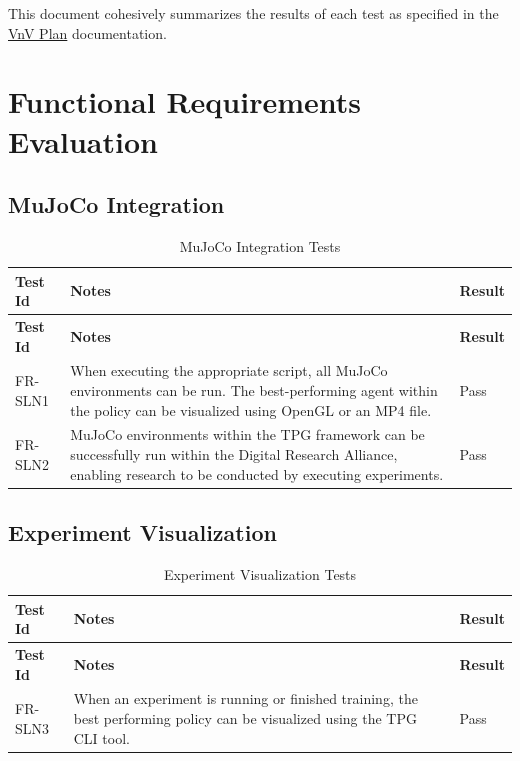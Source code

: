 \documentclass[12pt, titlepage]{article}
\begin{document}
\newpage


This document cohesively summarizes the results of each test as specified in the \href{https://github.com/TPGEngine/tpg/blob/main/docs/VnVPlan/VnVPlan.pdf}{VnV Plan} documentation.

\section{Functional Requirements Evaluation}

\subsection{MuJoCo Integration}\label{mujoco_integration}

\begin{center}
    \begin{longtable}{|p{2cm}|p{8cm}|p{2cm}|}
      \caption{MuJoCo Integration Tests} \\
    \hline
    \textbf{Test Id} & \textbf{Notes} & \textbf{Result} \\
    \hline
    \endfirsthead
    \hline
    \textbf{Test Id} & \textbf{Notes} & \textbf{Result} \\
    \hline
    \endhead
    FR-SLN1 & When executing the appropriate script, all MuJoCo environments can be run. The best-performing agent within the policy can be visualized using OpenGL or an MP4 file. & Pass \\
    \hline
    FR-SLN2 & MuJoCo environments within the TPG framework can be successfully run within the Digital Research Alliance, enabling research to be conducted by executing experiments. & Pass \\
    \hline
    \end{longtable}
\end{center}

\subsection{Experiment Visualization}\label{experiment_visualization}

\begin{center}
  \begin{longtable}{|p{2cm}|p{8cm}|p{2cm}|}
    \caption{Experiment Visualization Tests} \\
  \hline
  \textbf{Test Id} & \textbf{Notes} & \textbf{Result} \\
  \hline
  \endfirsthead
  \hline
  \textbf{Test Id} & \textbf{Notes} & \textbf{Result} \\
  \hline
  \endhead
  FR-SLN3 & When an experiment is running or finished training, the best performing policy can be visualized using the TPG CLI tool. & Pass \\
  \hline
  \end{longtable}
\end{center}
\end{document}
